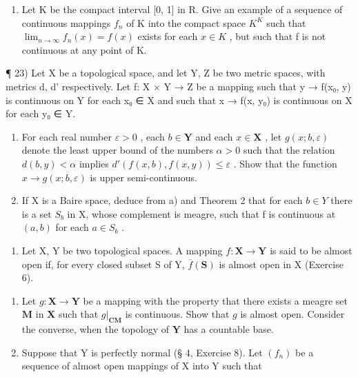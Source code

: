 \begin{enumerate}
\def\labelenumi{\alph{enumi})}
\setcounter{enumi}{1}
\tightlist
\item
  Let K be the compact interval {[}0, 1{]} in R. Give an example of a sequence of continuous mappings \(f_{n}\) of K into the compact space \(K^{K}\) such that \(\lim_{n\to\infty}f_{n}(x)=f(x)\) exists for each \(x\in K\) , but such that f is not continuous at any point of K.
\end{enumerate}

¶ 23) Let X be a topological space, and let Y, Z be two metric spaces, with metrics d, d' respectively. Let f: X × Y → Z be a mapping such that y → f(x₀, y) is continuous on Y for each x₀ ∈ X and such that x → f(x, y₀) is continuous on X for each y₀ ∈ Y.

\begin{enumerate}
\def\labelenumi{\alph{enumi})}
\item
  For each real number \(\varepsilon > 0\) , each \(b \in \mathbf{Y}\) and each \(x \in \mathbf{X}\) , let \(g(x; b, \varepsilon)\) denote the least upper bound of the numbers \(\alpha > 0\) such that the relation \(d(b, y) < \alpha\) implies \(d'(f(x, b), f(x, y)) \leqslant \varepsilon\) . Show that the function \(x \to g(x; b, \varepsilon)\) is upper semi-continuous.
\item
  If X is a Baire space, deduce from a) and Theorem 2 that for each \(b \in Y\) there is a set \(S_{b}\) in X, whose complement is meagre, such that f is continuous at \((a, b)\) for each \(a \in S_{b}\) .
\end{enumerate}

\begin{enumerate}
\def\labelenumi{\arabic{enumi})}
\setcounter{enumi}{23}
\tightlist
\item
  Let X, Y be two topological spaces. A mapping \(f: \mathbf{X} \to \mathbf{Y}\) is said to be almost open if, for every closed subset S of Y, \(\overline{f}(\mathbf{S})\) is almost open in X (Exercise 6).
\end{enumerate}

\begin{enumerate}
\def\labelenumi{\alph{enumi})}
\item
  Let \(g: \mathbf{X} \to \mathbf{Y}\) be a mapping with the property that there exists a meagre set \(\mathbf{M}\) in \(\mathbf{X}\) such that \(g|_{\mathbf{CM}}\) is continuous. Show that \(g\) is almost open. Consider the converse, when the topology of \(\mathbf{Y}\) has a countable base.
\item
  Suppose that Y is perfectly normal (§ 4, Exercise 8). Let \((f_n)\) be a sequence of almost open mappings of X into Y such that
\end{enumerate}


